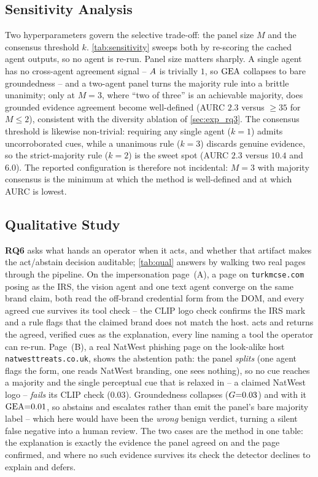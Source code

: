 \subsection{Sensitivity Analysis}
\label{sec:exp_rq5}
Two hyperparameters govern the selective trade-off: the panel size $M$ and the consensus
threshold $k$. \autoref{tab:sensitivity} sweeps both by re-scoring the cached agent outputs,
so no agent is re-run. Panel size matters sharply. A single agent has no cross-agent
agreement signal -- $A$ is trivially $1$, so $\mathrm{GEA}$ collapses to bare groundedness --
and a two-agent panel turns the majority rule into a brittle unanimity; only at $M{=}3$,
where ``two of three'' is an achievable majority, does grounded evidence agreement become
well-defined (AURC $2.3$ versus $\ge35$ for $M{\le}2$), consistent with the diversity
ablation of \autoref{sec:exp_rq3}. The consensus threshold is likewise non-trivial: requiring
any single agent ($k{=}1$) admits uncorroborated cues, while a unanimous rule ($k{=}3$)
discards genuine evidence, so the strict-majority rule ($k{=}2$) is the sweet spot
(AURC $2.3$ versus $10.4$ and $6.0$). The reported configuration is therefore not incidental:
$M{=}3$ with majority consensus is the minimum at which the method is well-defined and at
which AURC is lowest.


\subsection{Qualitative Study}
\label{sec:exp_rq6}
\textbf{RQ6} asks what \toolname{} hands an operator when it acts, and whether that
artifact makes the act/abstain decision auditable; \autoref{tab:qual} answers by walking
two real pages through the pipeline. On the impersonation page~(A), a page on
\texttt{turkmcse.com} posing as the IRS, the vision agent and one text agent converge on the
same brand claim, both read the off-brand credential form from the DOM, and every agreed cue
survives its tool check -- the CLIP logo check confirms the IRS mark and a rule flags that
the claimed brand does not match the host. \toolname{} acts and returns the agreed, verified
cues as the explanation, every line naming a tool the operator can re-run. Page~(B), a real
NatWest phishing page on the look-alike host \texttt{natwesttreats.co.uk}, shows the
abstention path: the panel \emph{splits} (one agent flags the form, one reads NatWest
branding, one sees nothing), so no cue reaches a majority and the single perceptual cue that
is relaxed in -- a claimed NatWest logo -- \emph{fails} its CLIP check ($0.03$). Groundedness
collapses ($G{=}0.03$) and with it $\mathrm{GEA}{=}0.01$, so \toolname{} abstains and
escalates rather than emit the panel's bare majority label -- which here would have been the
\emph{wrong} \textsf{benign} verdict, turning a silent false negative into a human review.
The two cases are the method in one table: the explanation is exactly the evidence the panel
agreed on and the page confirmed, and where no such evidence survives its check the detector
declines to explain and defers.


